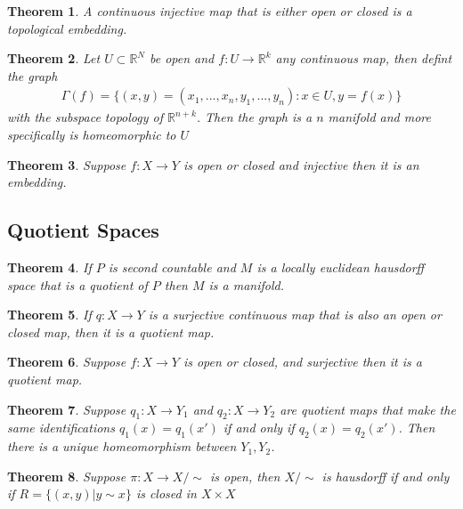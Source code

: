 \documentclass[11pt]{book}
\newtheorem{theorem}{Theorem}[section]
\begin{document}
	\begin{theorem}
		A continuous injective map that is either open or closed is a topological embedding.
	\end{theorem}
	
	\begin{theorem}
		Let $U \subset \mathbb{R}^N$ be open and $f: U \rightarrow \mathbb{R}^k$ any continuous map, then defint the graph
		\begin{align*}
			\Gamma(f) = \{(x,y) = (x_1, ... , x_n, y_1, ... , y_n) : x \in U, y = f(x)\}
		\end{align*}
		with the subspace topology of $\mathbb{R}^{n+k}$. Then the graph is a $n$ manifold and more specifically is homeomorphic to $U$
	\end{theorem}
	
	\begin{theorem}
		Suppose $f: X \rightarrow Y$ is open or closed and injective then it is an embedding.
	\end{theorem}
	
	
	\subsection{Quotient Spaces}
	
	\begin{theorem}
		If $P$ is second countable and $M$ is a locally euclidean hausdorff space that is a quotient of $P$ then $M$ is a manifold.
	\end{theorem}
	
	\begin{theorem}
		If $q: X \rightarrow Y$ is a surjective continuous map that is also an open
		or closed map, then it is a quotient map.
	\end{theorem}
	
	\begin{theorem}
		Suppose $f: X \rightarrow Y$ is open or closed, and surjective then it is a quotient map.
	\end{theorem}
	
	\begin{theorem}
		Suppose $q_1: X \rightarrow Y_1$ and
		$q_2: X \rightarrow Y_2$ are quotient maps that make the same identifications $q_1(x) = q_1(x')$
		if and only if $q_2(x) = q_2(x')$. Then there is a unique homeomorphism between $Y_1, Y_2$.
	\end{theorem}
	
	\begin{theorem}
		Suppose $\pi: X \rightarrow X/\sim$ is open, then $X/\sim$ is hausdorff if and only if $R = \{(x,y) | y \sim x\}$ is closed in $X \times X$
	\end{theorem}
	
\end{document}
